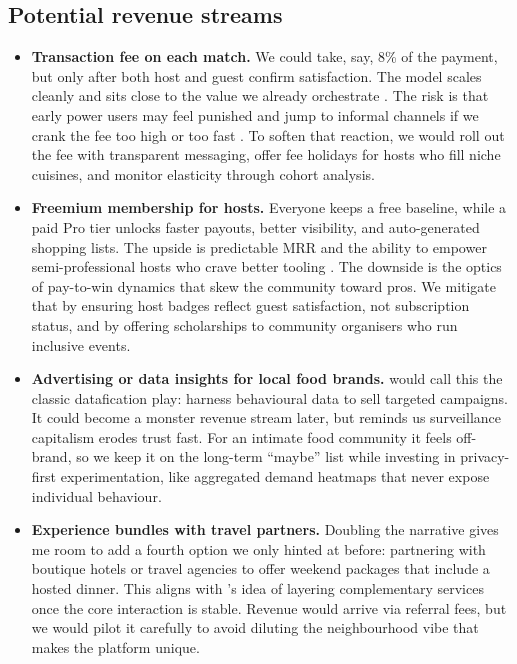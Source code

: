 \subsection*{Potential revenue streams}
\begin{itemize}
  \item \textbf{Transaction fee on each match.} We could take, say, 8\% of the payment, but only after both host and guest confirm satisfaction. The model scales cleanly and sits close to the value we already orchestrate \citep{HagiuWright2013}. The risk is that early power users may feel punished and jump to informal channels if we crank the fee too high or too fast \citep{Reillier2017}. To soften that reaction, we would roll out the fee with transparent messaging, offer fee holidays for hosts who fill niche cuisines, and monitor elasticity through cohort analysis.
  \item \textbf{Freemium membership for hosts.} Everyone keeps a free baseline, while a paid Pro tier unlocks faster payouts, better visibility, and auto-generated shopping lists. The upside is predictable MRR and the ability to empower semi-professional hosts who crave better tooling \citep{Choudary2016}. The downside is the optics of pay-to-win dynamics that skew the community toward pros. We mitigate that by ensuring host badges reflect guest satisfaction, not subscription status, and by offering scholarships to community organisers who run inclusive events.
  \item \textbf{Advertising or data insights for local food brands.} \citet{Srnicek2017} would call this the classic datafication play: harness behavioural data to sell targeted campaigns. It could become a monster revenue stream later, but \citet{Zuboff2019} reminds us surveillance capitalism erodes trust fast. For an intimate food community it feels off-brand, so we keep it on the long-term ``maybe'' list while investing in privacy-first experimentation, like aggregated demand heatmaps that never expose individual behaviour.
  \item \textbf{Experience bundles with travel partners.} Doubling the narrative gives me room to add a fourth option we only hinted at before: partnering with boutique hotels or travel agencies to offer weekend packages that include a hosted dinner. This aligns with \citet{Reillier2017}'s idea of layering complementary services once the core interaction is stable. Revenue would arrive via referral fees, but we would pilot it carefully to avoid diluting the neighbourhood vibe that makes the platform unique.
\end{itemize}

